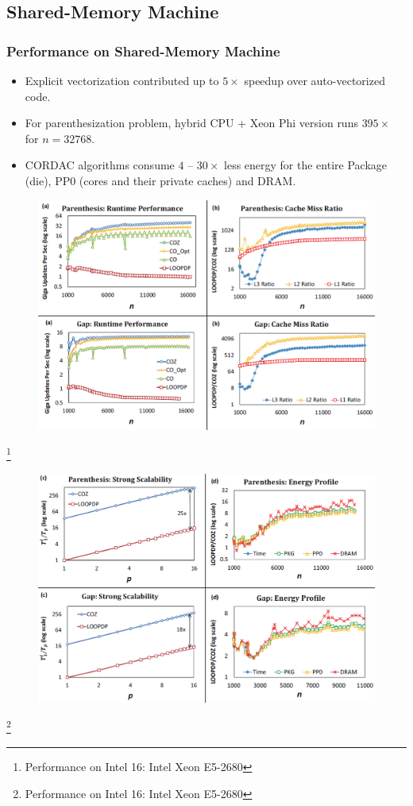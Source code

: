 \subsection{Shared-Memory Machine}
\begin{frame}
    \frametitle{Performance on Shared-Memory Machine}
    \begin{itemize}
    	\item Explicit vectorization contributed up to $5\times$ speedup
    		over auto-vectorized code.
    	\item For parenthesization problem, hybrid CPU + 
    		Xeon Phi version runs $395\times$ for $n = 32768$.
    	\item CORDAC algorithms consume $4$ -- $30\times$ less energy for the entire 
    		Package (die), PP0 (cores and their private caches) and DRAM.
    \end{itemize}
\end{frame}

\begin{frame}
    \begin{figure}
		\includegraphics[scale=0.3]{figure/fig-shared-machine-1.png}
	\end{figure}
	\footnote{Performance on Intel 16: Intel Xeon E5-2680}
\end{frame}

\begin{frame}
    \begin{figure}
		\includegraphics[scale=0.3]{figure/fig-shared-machine-2.png}
	\end{figure}
	\footnote{Performance on Intel 16: Intel Xeon E5-2680}
\end{frame}